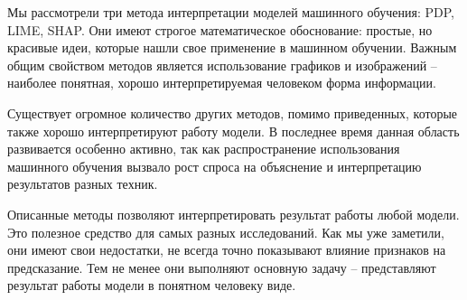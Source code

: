 Мы рассмотрели три метода интерпретации моделей машинного обучения: PDP, LIME, SHAP. Они имеют строгое математическое обоснование: простые, но красивые идеи, которые нашли свое применение в машинном обучении. Важным общим свойством методов является использование графиков и изображений -- наиболее понятная, хорошо интерпретируемая человеком форма информации.

Существует огромное количество других методов, помимо приведенных, которые также хорошо интерпретируют работу модели. В последнее время данная область развивается особенно активно, так как распространение использования машинного обучения вызвало рост спроса на объяснение и интерпретацию результатов разных техник. 

Описанные методы позволяют интерпретировать результат работы любой модели. Это полезное средство для самых разных исследований. Как мы уже заметили, они имеют свои недостатки, не всегда точно показывают влияние признаков на предсказание. Тем не менее они выполняют основную задачу -- представляют результат работы модели в понятном человеку виде.
